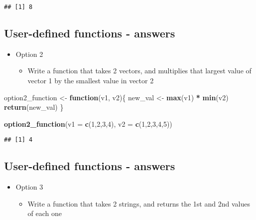\documentclass[]{article}
\newenvironment{Shaded}{\begin{snugshade}}{\end{snugshade}}
\newcommand{\KeywordTok}[1]{\textcolor[rgb]{0.13,0.29,0.53}{\textbf{#1}}}
\newcommand{\DataTypeTok}[1]{\textcolor[rgb]{0.13,0.29,0.53}{#1}}
\newcommand{\DecValTok}[1]{\textcolor[rgb]{0.00,0.00,0.81}{#1}}
\newcommand{\StringTok}[1]{\textcolor[rgb]{0.31,0.60,0.02}{#1}}
\newcommand{\ControlFlowTok}[1]{\textcolor[rgb]{0.13,0.29,0.53}{\textbf{#1}}}
\newcommand{\OperatorTok}[1]{\textcolor[rgb]{0.81,0.36,0.00}{\textbf{#1}}}
\newcommand{\NormalTok}[1]{#1}
\providecommand{\tightlist}{%
  \setlength{\itemsep}{0pt}\setlength{\parskip}{0pt}}
\begin{document}
\begin{verbatim}
## [1] 8
\end{verbatim}

\subsection{User-defined functions -
answers}\label{user-defined-functions---answers-1}

\begin{itemize}
\tightlist
\item
  Option 2

  \begin{itemize}
  \tightlist
  \item
    Write a function that takes 2 vectors, and multiplies that largest
    value of vector 1 by the smallest value in vector 2
  \end{itemize}
\end{itemize}

\begin{Shaded}
\begin{Highlighting}[]
\NormalTok{option2_function <-}\StringTok{ }\ControlFlowTok{function}\NormalTok{(v1, v2)\{}
\NormalTok{  new_val <-}\StringTok{ }\KeywordTok{max}\NormalTok{(v1) }\OperatorTok{*}\StringTok{ }\KeywordTok{min}\NormalTok{(v2)}
  \KeywordTok{return}\NormalTok{(new_val)}
\NormalTok{\}}

\KeywordTok{option2_function}\NormalTok{(}\DataTypeTok{v1 =} \KeywordTok{c}\NormalTok{(}\DecValTok{1}\NormalTok{,}\DecValTok{2}\NormalTok{,}\DecValTok{3}\NormalTok{,}\DecValTok{4}\NormalTok{), }\DataTypeTok{v2 =} \KeywordTok{c}\NormalTok{(}\DecValTok{1}\NormalTok{,}\DecValTok{2}\NormalTok{,}\DecValTok{3}\NormalTok{,}\DecValTok{4}\NormalTok{,}\DecValTok{5}\NormalTok{))}
\end{Highlighting}
\end{Shaded}

\begin{verbatim}
## [1] 4
\end{verbatim}

\subsection{User-defined functions -
answers}\label{user-defined-functions---answers-2}

\begin{itemize}
\tightlist
\item
  Option 3

  \begin{itemize}
  \tightlist
  \item
    Write a function that takes 2 strings, and returns the 1st and 2nd
    values of each one
  \end{itemize}
\end{itemize}
\end{document}
